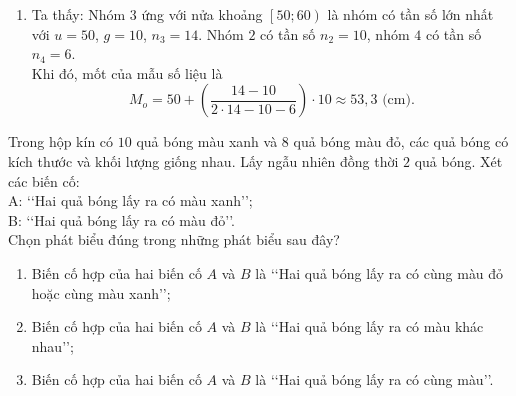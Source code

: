 \begin{bt}
{\begin{enumerate}
\begin{itemize}
				Khi đó, tứ phân vị thứ nhất là
				\[
				Q_1 = 40 + \dfrac{10 - 4}{10} \cdot 10 = 46\text{ (cm)}.
				\]
				\item Ta có $\dfrac{3n}{4} = 30$, mà $28 < 30 < 34$ nên nhóm $4$ là nhóm đầu tiên có tần số tích luỹ lớn hơn hoặc bằng $30$. \\
				Xét nhóm $4$ là nhóm $\left[60;70\right)$ có $t = 60$, $l = 10$, $n_4 = 6$ và nhóm $3$ có $cf_3 = 28$.\\
				Khi đó, tứ phân vị thứ ba là
				\[
				Q_3 = 60 + \dfrac{30 - 28}{6} \cdot 10 \approx 63{,}3\text{ (cm)}.
				\]
			\end{itemize}
			Vậy $55{,}5\text{ (cm)}$ là trung bình mẫu, $54{,}3\text{ (cm)}$ là trung vị của mẫu và $Q_1 = 46\text{ (cm)}$, $Q_2 = 54{,}3\text{ (cm)}$, $Q_3 = 63{,}3\text{ (cm)}$ là tứ phân vị của mẫu.
			\item Ta thấy: Nhóm $3$ ứng với nửa khoảng $\left[50;60\right)$ là nhóm có tần số lớn nhất với $u=50$, $g=10$, $n_3 = 14$. Nhóm $2$ có tần số $n_2 = 10$, nhóm $4$ có tần số $n_4 = 6$.\\
			Khi đó, mốt của mẫu số liệu là 
			\[
			M_o = 50 + \left( \dfrac{14 - 10}{2\cdot 14 - 10 - 6} \right) \cdot 10 \approx 53{,}3\text{ (cm)}.
			\]
		\end{enumerate}
	}
\end{bt}

\begin{vd}%
	Trong hộp kín có $10$ quả bóng màu xanh và $8$ quả bóng màu đỏ, các quả bóng có kích thước và khối lượng giống nhau. Lấy ngẫu nhiên đồng thời $2$ quả bóng. Xét các biến cố:\\
	A: \lq\lq Hai quả bóng lấy ra có màu xanh\rq\rq;\\
	B: \lq\lq Hai quả bóng lấy ra có màu đỏ\rq\rq.\\
	Chọn phát biểu đúng trong những phát biểu sau đây?
	\begin{enumerate}
		\item Biến cố hợp của hai biến cố $A$ và $B$ là \lq\lq Hai quả bóng lấy ra có cùng màu đỏ hoặc cùng màu xanh\rq\rq;
		\item Biến cố hợp của hai biến cố $A$ và $B$ là \lq\lq Hai quả bóng lấy ra có màu khác nhau\rq\rq;
		\item Biến cố hợp của hai biến cố $A$ và $B$ là \lq\lq Hai quả bóng lấy ra có cùng màu\rq\rq.
	\end{enumerate}
\end{vd}

